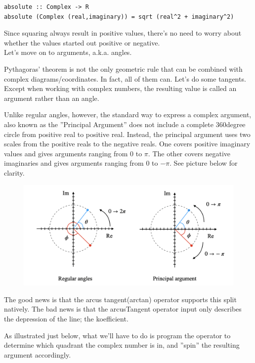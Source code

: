 \begin{verbatim}
absolute :: Complex -> R
absolute (Complex (real,imaginary)) = sqrt (real^2 + imaginary^2)
\end{verbatim}
Since squaring always result in positive values, there's no need to worry about whether the values started out positive or negative.\\
Let's move on to arguments, a.k.a. angles.

Pythagoras' theorem is not the only geometric rule that can be combined with complex diagrams/coordinates. In fact, all of them can. Let's do some tangents. Except when working with complex numbers, the resulting value is called an argument rather than an angle.

Unlike regular angles, however, the standard way to express a complex argument, also known as the ''Principal Argument'' does not include a complete 360degree circle from positive real to positive real. Instead, the principal argument uses two scales from the positive reals to the negative reals. One covers positive imaginary values and gives arguments ranging from 0 to $\pi$. The other covers negative imaginaries and gives arguments ranging from 0 to $-\pi$. See picture below for clarity.

\begin{figure}[h!]
    \centering
    \includegraphics[scale= 0.45]{arg.png}
    \caption{}
    \label{arg}
\end{figure}

The good news is that the arcus tangent(arctan) operator supports this split natively. The bad news is that the arcusTangent operator input only describes the depression of the line; the koefficient.

As illustrated just below, what we'll have to do is program the operator to determine which quadrant the complex number is in, and ''spin'' the resulting argument accordingly.

